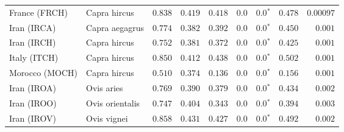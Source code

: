 \begin{center}
\begin{adjustbox}{width = 1\textwidth}
\begin{tabular}{|l|l|r|r|r|r|r|r|r|}
                  France (FRCH) &         Capra hircus &                                        $ 0.838$ &                                           $ 0.419$ &                      $ 0.418$ &            $0.0$ &                  $\bm{0.0{^*}}$ &                                           $ 0.478$ &          $0.00097$ \\
                    Iran (IRCA) &       Capra aegagrus &                                        $ 0.774$ &                                           $ 0.382$ &                      $ 0.392$ &            $0.0$ &                  $\bm{0.0{^*}}$ &                                           $ 0.450$ &           $ 0.001$ \\
                    Iran (IRCH) &         Capra hircus &                                        $ 0.752$ &                                           $ 0.381$ &                      $ 0.372$ &            $0.0$ &                  $\bm{0.0{^*}}$ &                                           $ 0.425$ &           $ 0.001$ \\
                   Italy (ITCH) &         Capra hircus &                                        $ 0.850$ &                                           $ 0.412$ &                      $ 0.438$ &            $0.0$ &                  $\bm{0.0{^*}}$ &                                           $ 0.502$ &           $ 0.001$ \\
                 Morocco (MOCH) &         Capra hircus &                                        $ 0.510$ &                                           $ 0.374$ &                      $ 0.136$ &            $0.0$ &                  $\bm{0.0{^*}}$ &                                           $ 0.156$ &           $ 0.001$ \\
                    Iran (IROA) &           Ovis aries &                                        $ 0.769$ &                                           $ 0.390$ &                      $ 0.379$ &            $0.0$ &                  $\bm{0.0{^*}}$ &                                           $ 0.434$ &           $ 0.002$ \\
                    Iran (IROO) &      Ovis orientalis &                                        $ 0.747$ &                                           $ 0.404$ &                      $ 0.343$ &            $0.0$ &                  $\bm{0.0{^*}}$ &                                           $ 0.394$ &           $ 0.003$ \\
                    Iran (IROV) &          Ovis vignei &                                        $ 0.858$ &                                           $ 0.431$ &                      $ 0.427$ &            $0.0$ &                  $\bm{0.0{^*}}$ &                                           $ 0.492$ &           $ 0.002$ \\

\end{tabular}
\end{adjustbox}
\end{center}

